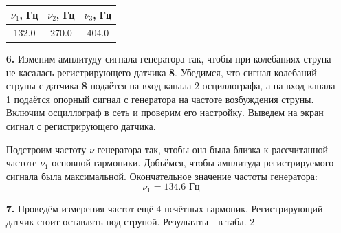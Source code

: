 \documentclass[a4paper]{article}
\begin{document}
\begin{itemize}
\begin{table}[h!]
\centering
\begin{minipage}{0.5\linewidth}
\centering
\begin{tabular}{|c|c|c|}
\hline
$\nu_1$, Гц & $\nu_2$, Гц & $\nu_3$, Гц \\ \hline
132.0       & 270.0       & 404.0       \\ \hline
\end{tabular}
\caption{}
\end{minipage}
\end{table}
\item[\textbf{6. }] Изменим амплитуду сигнала генератора так, чтобы при колебаниях струна не касалась регистрирующего датчика \textbf{8}. Убедимся, что сигнал колебаний струны с датчика \textbf{8} подаётся на вход канала 2 осциллографа, а на вход канала 1 подаётся опорный сигнал с генератора на частоте возбуждения струны.
Включим осциллограф в сеть и проверим его настройку. Выведем на экран сигнал с регистрирующего датчика. 

\noindent
Подстроим частоту $\nu$ генератора так, чтобы она была близка к рассчитанной частоте $\nu_1$ основной гармоники. Добьёмся, чтобы амплитуда регистрируемого сигнала была максимальной. Окончательное значение частоты генератора:
\[\nu_1 = 134.6 \text{ Гц} \]
\item[\textbf{7. }] Проведём измерения частот ещё 4 нечётных гармоник. Регистрирующий датчик стоит оставлять под струной. Результаты - в табл. 2


\end{itemize}
\end{document}
